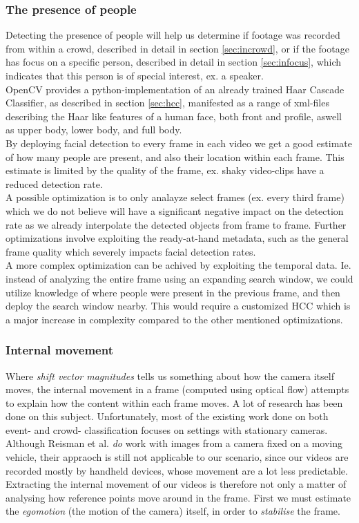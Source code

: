 \subsubsection{The presence of people}\label{sec:peopledata}
%
Detecting the presence of people will help us determine if footage was recorded from within a crowd, described in detail in section \ref{sec:incrowd}, or if the footage has focus on a specific person, described in detail in section \ref{sec:infocus}, which indicates that this person is of special interest, ex. a speaker.\\
OpenCV provides a python-implementation of an already trained Haar Cascade Classifier, as described in section \ref{sec:hcc}, manifested as a range of xml-files describing the Haar like features of a human face, both front and profile, aswell as upper body, lower body, and full body.\\
%
By deploying facial detection to every frame in each video we get a good estimate of how many people are present, and also their location within each frame. This estimate is limited by the quality of the frame, ex. shaky video-clips have a reduced detection rate.\\
%
A possible optimization is to only analayze select frames (ex. every third frame) which we do not believe will have a significant negative impact on the detection rate as we already interpolate the detected objects from frame to frame. Further optimizations involve exploiting the ready-at-hand metadata, such as the general frame quality which severely impacts facial detection rates.\\
A more complex optimization can be achived by exploiting the temporal data. Ie. instead of analyzing the entire frame using an expanding search window, we could utilize knowledge of where people were present in the previous frame, and then deploy the search window nearby. This would require a customized HCC which is a major increase in complexity compared to the other mentioned optimizations.
%
\subsubsection{Internal movement}\label{sec:opticalflowdata}
%
Where \textit{shift vector magnitudes} tells us something about how the camera itself moves, the internal movement in a frame (computed using optical flow) attempts to explain how the content within each frame moves. A lot of research has been done on this subject. Unfortunately, most of the existing work done on both event- and crowd- classification focuses on settings with stationary cameras. Although Reisman et al. \cite{CrowdDetectionInVideoSequences} \textit{do} work with images from a camera fixed on a moving vehicle, their appraoch is still not applicable to our scenario, since our videos are recorded mostly by handheld devices, whose movement are a lot less predictable. Extracting the internal movement of our videos is therefore not only a matter of analysing how reference points move around in the frame. First we must estimate the \textit{egomotion} (the motion of the camera) itself, in order to \textit{stabilise} the frame.
%
